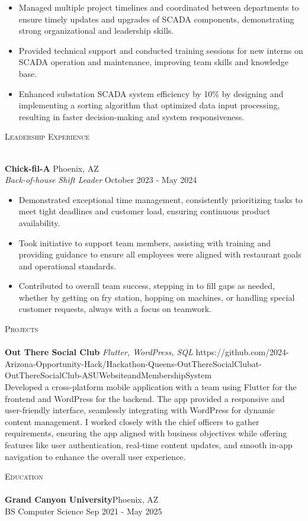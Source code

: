 \documentclass[a4paper]{article}
\newcommand{\lineunder} {
    \vspace*{-8pt} \\
    \hspace*{-18pt} \hrulefill \\
}
\newcommand{\header} [1] {
    {\hspace*{-18pt}\vspace*{6pt} \textsc{#1}}
    \vspace*{-6pt} \lineunder
}
\begin{document}
\begin{itemize} \itemsep 1pt
	\item Managed multiple project timelines and coordinated between departments to ensure timely updates and upgrades of SCADA components, demonstrating strong organizational and leadership skills.
	\item Provided technical support and conducted training sessions for new interns on SCADA operation and maintenance, improving team skills and knowledge base.
	\item Enhanced substation SCADA system efficiency by 10\% by designing and implementing a sorting algorithm that optimized data input processing, resulting in faster decision-making and system responsiveness.

	\end{itemize}

\header{Leadership Experience}
\vspace{1mm}

\textbf{Chick-fil-A} \hfill Phoenix, AZ\\
\textit{Back-of-house Shift Leader} \hfill October 2023 - May 2024\\
\vspace{-1mm}
\begin{itemize} \itemsep 1pt
	\item Demonstrated exceptional time management, consistently prioritizing tasks to meet tight deadlines and customer load, ensuring continuous product availability.
	\item Took initiative to support team members, assisting with training and providing guidance to ensure all employees were aligned with restaurant goals and operational standards.
	\item Contributed to overall team success, stepping in to fill gaps as needed, whether by getting on fry station, hopping on machines, or handling special customer requests, always with a focus on teamwork.
 
\end{itemize}

\header{Projects}
{\textbf{Out There Social Club}} {\sl Flutter, WordPress, SQL} \hfill https://github.com/2024-Arizona-Opportunity-Hack/Hackathon-Queens-OutThereSocialClubat-OutThereSocialClub-ASUWebsiteandMembershipSystem\\
Developed a cross-platform mobile application with a team using Flutter for the frontend and WordPress for the backend. The app provided a responsive and user-friendly interface, seamlessly integrating with WordPress for dynamic content management. I worked closely with the chief officers to gather requirements, ensuring the app aligned with business objectives while offering features like user authentication, real-time content updates, and smooth in-app navigation to enhance the overall user experience.\\
\vspace*{2mm}

\header{Education}
\textbf{Grand Canyon University}\hfill Phoenix, AZ\\
BS Computer Science \hfill Sep 2021 - May 2025\\
\vspace{2mm}


\ 
\end{document}

